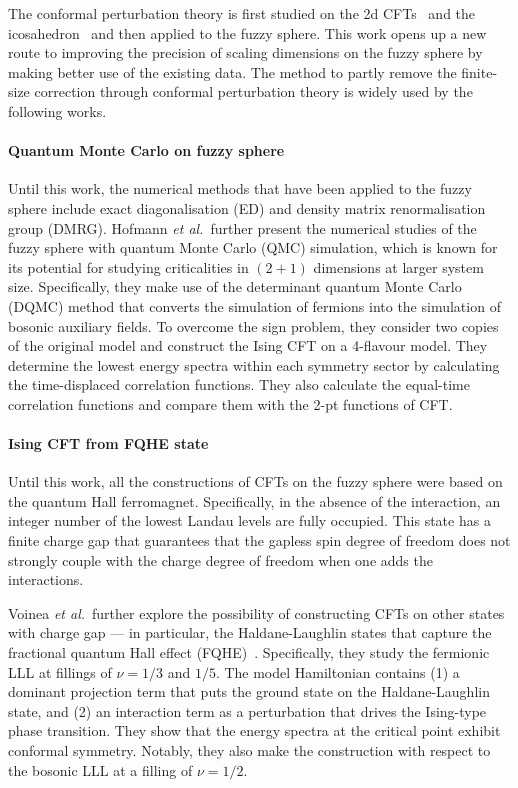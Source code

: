 \documentclass{timesjhep}
\begin{document}
The conformal perturbation theory is first studied on the 2d CFTs~\cite{Reinicke1987Perturbation1,Reinicke1987Perturbation2} and the icosahedron~\cite{Lao2023} and then applied to the fuzzy sphere. This work opens up a new route to improving the precision of scaling dimensions on the fuzzy sphere by making better use of the existing data. The method to partly remove the finite-size correction through conformal perturbation theory is widely used by the following works.

\paragraph{Quantum Monte Carlo on fuzzy sphere~\cite{Hofmann2023}}

Until this work, the numerical methods that have been applied to the fuzzy sphere include exact diagonalisation (ED) and density matrix renormalisation group (DMRG). Hofmann \textit{et al.}~further present the numerical studies of the fuzzy sphere with quantum Monte Carlo (QMC) simulation, which is known for its potential for studying criticalities in $(2+1)$ dimensions at larger system size. Specifically, they make use of the determinant quantum Monte Carlo (DQMC) method that converts the simulation of fermions into the simulation of bosonic auxiliary fields. To overcome the sign problem, they consider two copies of the original model and construct the Ising CFT on a 4-flavour model. They determine the lowest energy spectra within each symmetry sector by calculating the time-displaced correlation functions. They also calculate the equal-time correlation functions and compare them with the 2-pt functions of CFT.

\paragraph{Ising CFT from FQHE state~\cite{Voinea2024}}

Until this work, all the constructions of CFTs on the fuzzy sphere were based on the quantum Hall ferromagnet. Specifically, in the absence of the interaction, an integer number of the lowest Landau levels are fully occupied. This state has a finite charge gap that guarantees that the gapless spin degree of freedom does not strongly couple with the charge degree of freedom when one adds the interactions.

Voinea \textit{et al.}~further explore the possibility of constructing CFTs on other states with charge gap --- in particular, the Haldane-Laughlin states that capture the fractional quantum Hall effect (FQHE)~\cite{Haldane1983LLL,Laughlin1983FQHE}. Specifically, they study the fermionic LLL at fillings of $\nu=1/3$ and $1/5$. The model Hamiltonian contains (1) a dominant projection term that puts the ground state on the Haldane-Laughlin state, and (2) an interaction term as a perturbation that drives the Ising-type phase transition. They show that the energy spectra at the critical point exhibit conformal symmetry. Notably, they also make the construction with respect to the bosonic LLL at a filling of $\nu=1/2$.
\end{document}
